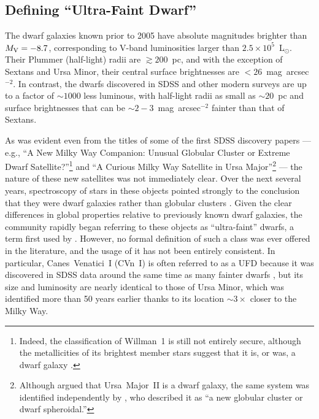 \documentclass[a4paper]{ar-1col}
\begin{document}
\subsection{Defining ``Ultra-Faint Dwarf''}
\label{sec:definition}

The dwarf galaxies known prior to 2005 have absolute magnitudes
brighter than $M_{{\rm V}} = -8.7$, corresponding to V-band
luminosities larger than $2.5 \times 10^{5}$~L$_{\odot}$.  Their
Plummer (half-light) radii are $\gtrsim200$~pc, and with the exception
of Sextans and Ursa Minor, their central surface brightnesses are
$<26$~mag~arcsec$^{-2}$.  In contrast, the dwarfs discovered in SDSS
and other modern surveys are up to a factor of $\sim1000$ less
luminous, with half-light radii as small as $\sim20$~pc and surface
brightnesses that can be $\sim2-3$~mag~arcsec$^{-2}$ fainter than that
of Sextans.

As was evident even from the titles of some of the first SDSS
discovery papers --- e.g., ``A New Milky Way Companion: Unusual
Globular Cluster or Extreme Dwarf Satellite?''\footnote{Indeed, the
  classification of Willman~1 is still not entirely secure, although
  the metallicities of its brightest member stars suggest that it is,
  or was, a dwarf galaxy \citep{willman11}.} \citep{willman05a} and
``A Curious Milky Way Satellite in Ursa Major''\footnote{Although
  \citet{zucker06b} argued that Ursa~Major~II is a dwarf galaxy, the
  same system was identified independently by \citet{grillmair06}, who
  described it as ``a new globular cluster or dwarf spheroidal.''}
\citep{zucker06b} --- the nature of these new satellites was not
immediately clear.  Over the next several years, spectroscopy of stars
in these objects pointed strongly to the conclusion that they were
dwarf galaxies rather than globular clusters
\citep{kleyna05,munoz06,martin07,sg07}.  Given the clear differences
in global properties relative to previously known dwarf galaxies, the
community rapidly began referring to these objects as ``ultra-faint''
dwarfs, a term first used by \citet{willman05a}.  However, no formal
definition of such a class was ever offered in the literature, and the
usage of it has not been entirely consistent.  In particular,
Canes~Venatici~I (CVn~I) is often referred to as a UFD because it was
discovered in SDSS data around the same time as many fainter dwarfs
\citep{zucker06a}, but its size and luminosity are nearly identical to
those of Ursa Minor, which was identified more than 50 years earlier
thanks to its location $\sim3\times$ closer to the Milky Way.
\end{document}
